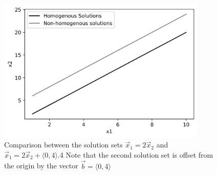 \documentclass[11pt, a4paper]{article}
\begin{document}
\begin{figure}[h]
  \centerline{\includegraphics[width=10cm]{images/Solution_sets.png}}
  \caption{Comparison between the solution sets $\vec{x}_1 = 2\vec{x}_2$ and $\vec{x}_1 = 2\vec{x}_2 + \langle 0, 4 \rangle$.4
  Note that the second solution set is offset from the origin by the vector $\vec{b} = \langle 0, 4 \rangle$}
\end{figure}
\end{document}
